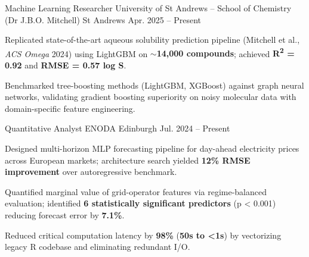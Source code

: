

\begin{cventries}

  \cventry
    {Machine Learning Researcher} %
    {University of St Andrews -- School of Chemistry (Dr J.B.O. Mitchell)} %
    {St Andrews} %
    {Apr. 2025 -- Present} %
    {
      \begin{cvitems}
        \item {Replicated state-of-the-art aqueous solubility prediction pipeline (Mitchell et al., \textit{ACS Omega} 2024) using LightGBM on \textbf{$\sim$14,000 compounds}; achieved \textbf{R\textsuperscript{2} = 0.92} and \textbf{RMSE = 0.57 log S}.}
        \item {Benchmarked tree-boosting methods (LightGBM, XGBoost) against graph neural networks, validating gradient boosting superiority on noisy molecular data with domain-specific feature engineering.}
      \end{cvitems}
    }

  \cventry
    {Quantitative Analyst} %
    {ENODA} %
    {Edinburgh} %
    {Jul. 2024 -- Present} %
    {
      \begin{cvitems}
        \item {Designed multi-horizon MLP forecasting pipeline for day-ahead electricity prices across European markets; architecture search yielded \textbf{12\% RMSE improvement} over autoregressive benchmark.}
        \item {Quantified marginal value of grid-operator features via regime-balanced evaluation; identified \textbf{6 statistically significant predictors} (p < 0.001) reducing forecast error by \textbf{7.1\%}.}
        \item {Reduced critical computation latency by \textbf{98\%} (\textbf{50s to <1s}) by vectorizing legacy R codebase and eliminating redundant I/O.}
      \end{cvitems}
    }


\end{cventries}
